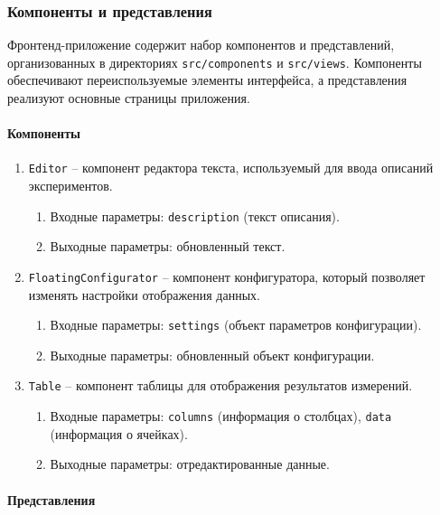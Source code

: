 \subsubsection{Компоненты и представления}

Фронтенд-приложение содержит набор компонентов и представлений, организованных в директориях \texttt{src/components} и \texttt{src/views}.
Компоненты обеспечивают переиспользуемые элементы интерфейса, а представления реализуют основные страницы приложения.

\paragraph{Компоненты}

\begin{enumerate}
\item \texttt{Editor} -- компонент редактора текста, используемый для ввода описаний экспериментов.
\begin{enumerate}[label=\arabic{enumi}.\arabic*.]
\item Входные параметры: \texttt{description} (текст описания).
\item Выходные параметры: обновленный текст.
\end{enumerate}

\item \texttt{FloatingConfigurator} -- компонент конфигуратора, который позволяет изменять настройки отображения данных.
\begin{enumerate}[label=\arabic{enumi}.\arabic*.]
\item Входные параметры: \texttt{settings} (объект параметров конфигурации).
\item Выходные параметры: обновленный объект конфигурации.
\end{enumerate}

\item \texttt{Table} -- компонент таблицы для отображения результатов измерений.
\begin{enumerate}[label=\arabic{enumi}.\arabic*.]
\item Входные параметры: \texttt{columns} (информация о столбцах), \texttt{data} (информация о ячейках).
\item Выходные параметры: отредактированные данные.
\end{enumerate}
\end{enumerate}

\paragraph{Представления}

